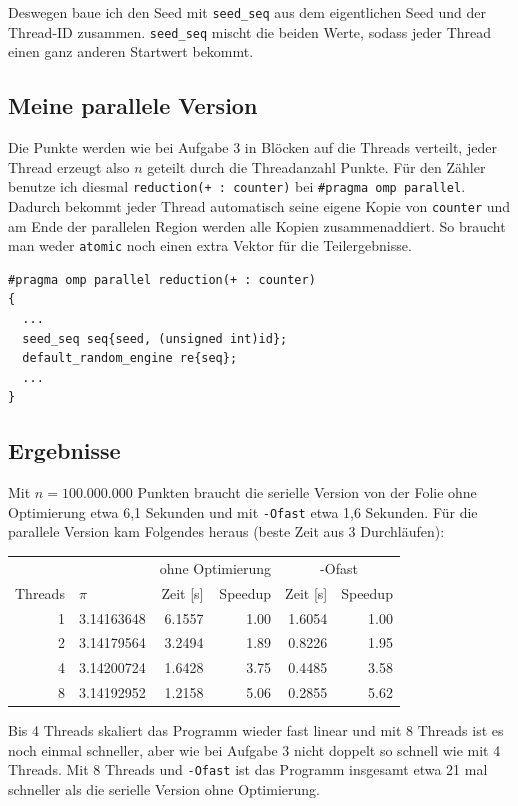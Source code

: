 \documentclass[11pt]{article}
\begin{document}
Deswegen baue ich den Seed mit \texttt{seed\_seq} aus dem eigentlichen Seed und der Thread-ID
zusammen. \texttt{seed\_seq} mischt die beiden Werte, sodass jeder Thread einen ganz anderen
Startwert bekommt.

\subsection*{Meine parallele Version}

Die Punkte werden wie bei Aufgabe 3 in Blöcken auf die Threads verteilt, jeder Thread erzeugt also
$n$ geteilt durch die Threadanzahl Punkte. Für den Zähler benutze ich diesmal
\verb|reduction(+ : counter)| bei \texttt{\#pragma omp parallel}. Dadurch bekommt jeder Thread
automatisch seine eigene Kopie von \texttt{counter} und am Ende der parallelen Region werden alle
Kopien zusammenaddiert. So braucht man weder \texttt{atomic} noch einen extra Vektor für die
Teilergebnisse.
\begin{verbatim}
#pragma omp parallel reduction(+ : counter)
{
  ...
  seed_seq seq{seed, (unsigned int)id};
  default_random_engine re{seq};
  ...
}
\end{verbatim}

\subsection*{Ergebnisse}

Mit $n = 100.000.000$ Punkten braucht die serielle Version von der Folie ohne Optimierung etwa
6,1 Sekunden und mit \texttt{-Ofast} etwa 1,6 Sekunden. Für die parallele Version kam Folgendes
heraus (beste Zeit aus 3 Durchläufen):

\begin{center}
\begin{tabular}{rlrrrr}
 & & \multicolumn{2}{c}{ohne Optimierung} & \multicolumn{2}{c}{-Ofast} \\
Threads & $\pi$ & Zeit [s] & Speedup & Zeit [s] & Speedup \\
\hline
1 & 3.14163648 & 6.1557 & 1.00 & 1.6054 & 1.00 \\
2 & 3.14179564 & 3.2494 & 1.89 & 0.8226 & 1.95 \\
4 & 3.14200724 & 1.6428 & 3.75 & 0.4485 & 3.58 \\
8 & 3.14192952 & 1.2158 & 5.06 & 0.2855 & 5.62 \\
\end{tabular}
\end{center}

Bis 4 Threads skaliert das Programm wieder fast linear und mit 8 Threads ist es noch einmal
schneller, aber wie bei Aufgabe 3 nicht doppelt so schnell wie mit 4 Threads. Mit 8 Threads und
\texttt{-Ofast} ist das Programm insgesamt etwa 21 mal schneller als die serielle Version ohne
Optimierung.
\end{document}
